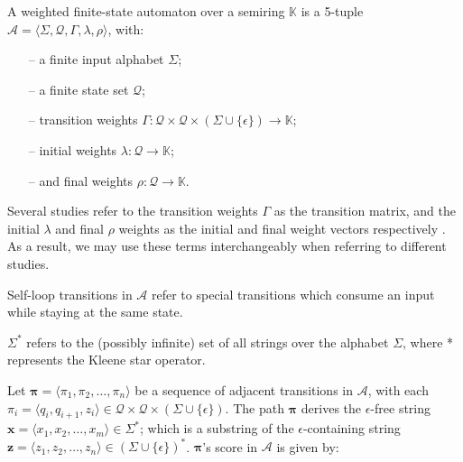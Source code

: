 \begin{definition}
  \label{def:wfsa}
  A weighted finite-state automaton over a semiring $\mathbb{K}$ is a 5-tuple $\mathcal{A} = \langle \Sigma, \mathcal{Q}, \Gamma, \lambda, \rho \rangle$, with:

  \begin{itemize}
    \itemsep0em 
    \item[--] a finite input alphabet $\Sigma$;
    \item[--] a finite state set $\mathcal{Q}$;
    \item[--] transition weights $\Gamma: \mathcal{Q} \times \mathcal{Q} \times (\Sigma \cup \{\epsilon\}) \rightarrow \mathbb{K}$;
    \item[--] initial weights $\lambda: \mathcal{Q} \rightarrow \mathbb{K}$; 
    \item[--] and final weights $\rho: \mathcal{Q} \rightarrow \mathbb{K}$.
  \end{itemize}

  \begin{remark}
    Several studies refer to the transition weights $\Gamma$ as the transition matrix, and the initial $\lambda$ and final $\rho$ weights as the initial and final weight vectors respectively \citep{schwartz2018sopa,jiang2020cold}. As a result, we may use these terms interchangeably when referring to different studies.
  \end{remark}
  
  \begin{remark}
    Self-loop transitions in $\mathcal{A}$ refer to special transitions which consume an input while staying at the same state.
  \end{remark}
  
  \begin{remark}
    $\Sigma^{*}$ refers to the (possibly infinite) set of all strings over the alphabet $\Sigma$, where * represents the Kleene star operator.
  \end{remark}
   
\end{definition}

\begin{definition}

  Let $\pmb{\pi} = \langle \pi_1, \pi_2, \dots, \pi_n \rangle$ be a sequence of adjacent transitions in $\mathcal{A}$, with each $\pi_i = \langle q_i, q_{i+1}, z_i \rangle \in \mathcal{Q} \times \mathcal{Q} \times (\Sigma \cup \{\epsilon\})$. The path $\pmb{\pi}$ derives the $\epsilon$-free string $\pmb{x} = \langle x_1, x_2, \dots, x_m \rangle \in \Sigma^{*}$; which is a substring of the $\epsilon$-containing string $\pmb{z} = \langle z_1, z_2, \dots, z_n \rangle \in (\Sigma \cup \{\epsilon\})^{*}$. $\pmb{\pi}$'s score in $\mathcal{A}$ is given by:
  
\end{definition}

